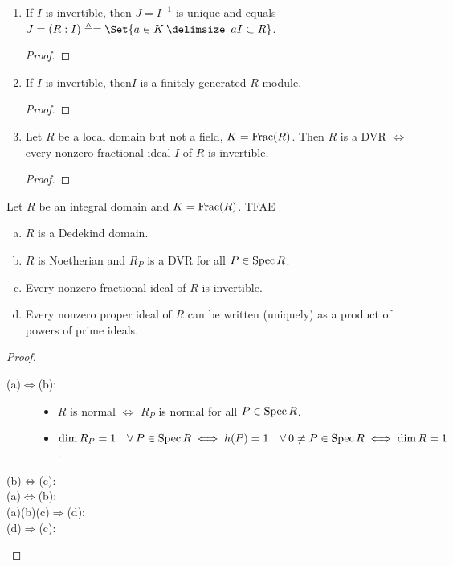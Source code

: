 \begin{prop}\mbox{}
  \begin{enumerate}
    \item If $I$ is invertible, then $J = I^{-1}$ is unique and equals
      $J = (R:I) \triangleq = \Set{a \in K \given aI \subset R}$.
      \begin{proof}
      \end{proof}
    \item If $I$ is invertible, then$I$ is a finitely generated $R$-module.
      \begin{proof}
      \end{proof}
    \item Let $R$ be a local domain but not a field, $K = \operatorname{Frac}(R)$.
      Then $R$ is a DVR $\iff$ every nonzero fractional ideal $I$ of $R$ is
      invertible.
      \begin{proof}
      \end{proof}
  \end{enumerate}
\end{prop}

\begin{theorem}
  Let $R$ be an integral domain and $K= \operatorname{Frac}(R)$. TFAE
  \begin{enumerate}[(a)]
    \item $R$ is a Dedekind domain.
    \item $R$ is Noetherian and $R_P$ is a DVR for all $P \in \operatorname{Spec} R$.
    \item Every nonzero fractional ideal of $R$ is invertible.
    \item Every nonzero proper ideal of $R$ can be written (uniquely) as a
      product of powers of prime ideals.
  \end{enumerate}

  \begin{proof} \mbox{}
    \begin{description}
      \item[\rm (a)$\Leftrightarrow$(b):] \mbox{}
        \begin{itemize}
          \item $R$ is normal $\iff$ $R_P$ is normal for all $P \in \operatorname{Spec} R$.
          \item $\dim R_P = 1 \quad \forall P \in \Spec R \iff h(P) = 1 \quad
            \forall 0 \ne P \in \Spec R \iff \dim R = 1$.
        \end{itemize}
      \item[\rm (b)$\Leftrightarrow$(c):]
      \item[\rm (a)$\Leftrightarrow$(b):]
      \item[\rm (a)(b)(c)$\Rightarrow$(d):]
      \item[\rm (d)$\Rightarrow$(c):]
  \end{description}
  \end{proof}
\end{theorem}
